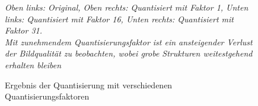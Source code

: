 \begin{appendices}
\begin{figure}[h!]
    \caption{Ergebnis der Quantisierung mit verschiedenen Quantisierungsfaktoren}
    \textit{Oben links: Original, Oben rechts: Quantisiert mit Faktor 1, Unten links: Quantisiert mit Faktor 16, Unten rechts: Quantisiert mit Faktor 31.\\
    Mit zunehmendem Quantisierungsfaktor ist ein ansteigender Verlust der Bildqualität zu beobachten, wobei grobe Strukturen weitestgehend erhalten bleiben}
    \label{fig:chroma_artefacts}
\end{figure}
\end{appendices}
